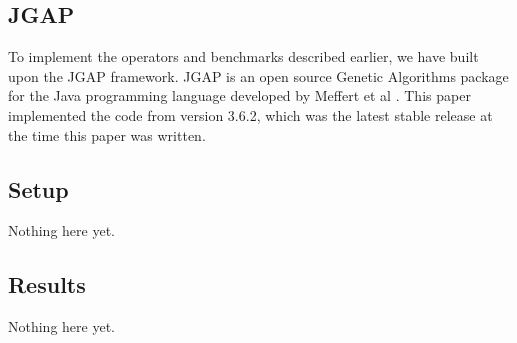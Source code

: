 \subsection*{JGAP}
To implement the operators and benchmarks described earlier, we have built upon the JGAP framework. JGAP is an open source Genetic Algorithms package for the Java programming language developed by Meffert et al \cite{jgap}. This paper implemented the code from version 3.6.2, which was the latest stable release at the time this paper was written.

\subsection*{Setup}
Nothing here yet.

\subsection*{Results}
Nothing here yet.